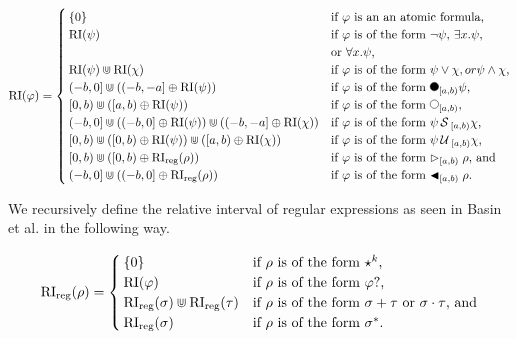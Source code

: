 \begin{equation*}
    \RI(\varphi) =
    \begin{cases}
        \{0\}     & \text{if $\varphi$ is an an atomic formula,} \\ 
        \RI(\psi) & \text{if $\varphi$ is of the form $\neg \psi$, 
                            $\exists x.\psi$,} \\ &\text{or $\forall x.\psi$,} \\
        \RI(\psi) \Cup \RI(\chi) & \text{if $\varphi$ is of the form $\psi \lor \chi, or
                                         \psi \land \chi$,} \\
        (-b,0] \Cup ((-b,-a] \oplus \RI(\psi)) & \text{if $\varphi$ is of the form $\Previous_{[a,b)}\psi$,} \\
        [0,b) \Cup ([a,b) \oplus \RI(\psi)) & \text{if $\varphi$ is of the form $\Next_{[a,b)}$,}\\
        (-b,0] \Cup ((-b,0] \oplus \RI(\psi)) \Cup ((-b,-a] \oplus \RI(\chi)) & \text{if $\varphi$ is of the form $\psi \Since_{[a,b)} \chi$,} \\
        [0,b) \Cup ([0,b) \oplus \RI(\psi)) \Cup ([a,b) \oplus \RI(\chi)) & \text{if $\varphi$ is of the form $\psi \Until_{[a,b)} \chi$,} \\
        [0,b) \Cup ([0,b) \oplus \RIr(\rho)) & \text{if $\varphi$ is of the form $\Fregex_{[a,b)} \rho$, and}\\
        (-b,0] \Cup ((-b,0] \oplus \RIr(\rho)) & \text{if $\varphi$ is of the form $\Pregex_{[a,b)} \rho$.}\\
    \end{cases}
\end{equation*}

We recursively define the relative interval of regular expressions as seen in Basin et al. \cite{Basin2020} in the following way.

\begin{equation*}
    \operatorname{RI}_{\text{reg}}(\rho) =
    \begin{cases}
        \{0\} & \text{if $\rho$ is of the form $\star^k$,} \\
        \operatorname{RI}(\varphi) & \text{if $\rho$ is of the form $\varphi?$,} \\
        \operatorname{RI}_{\text{reg}}(\sigma) \Cup \operatorname{RI}_{\text{reg}}(\tau) & \text{if $\rho$ is of the form $\sigma + \tau$ or $\sigma \cdot \tau$, and} \\
        \operatorname{RI}_{\text{reg}}(\sigma) & \text{if $\rho$ is of the form $\sigma^*$.}

    \end{cases}
\end{equation*}

